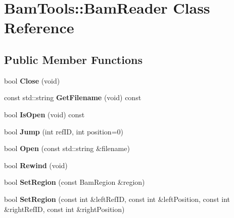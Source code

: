 \hypertarget{classBamTools_1_1BamReader}{\section{Bam\-Tools\-:\-:Bam\-Reader Class Reference}
\label{classBamTools_1_1BamReader}
}
\subsection*{Public Member Functions}
\begin{DoxyCompactItemize}
\item 
\hypertarget{classBamTools_1_1BamReader_a407a1b111a39799414861205888f5222}{bool {\bfseries Close} (void)}\label{classBamTools_1_1BamReader_a407a1b111a39799414861205888f5222}

\item 
\hypertarget{classBamTools_1_1BamReader_a89e0543264d18c3211af801c73a86f29}{const std\-::string {\bfseries Get\-Filename} (void) const }\label{classBamTools_1_1BamReader_a89e0543264d18c3211af801c73a86f29}

\item 
\hypertarget{classBamTools_1_1BamReader_ad7c2293df41620ccf29e755dc5e00baf}{bool {\bfseries Is\-Open} (void) const }\label{classBamTools_1_1BamReader_ad7c2293df41620ccf29e755dc5e00baf}

\item 
\hypertarget{classBamTools_1_1BamReader_a1fb656e73ef41db885dabeca2785168d}{bool {\bfseries Jump} (int ref\-I\-D, int position=0)}\label{classBamTools_1_1BamReader_a1fb656e73ef41db885dabeca2785168d}

\item 
\hypertarget{classBamTools_1_1BamReader_a1965ae6112e7dc0b604cb53ae8861a2c}{bool {\bfseries Open} (const std\-::string \&filename)}\label{classBamTools_1_1BamReader_a1965ae6112e7dc0b604cb53ae8861a2c}

\item 
\hypertarget{classBamTools_1_1BamReader_a2d92f430f12a0cf9e696c062a55e2c67}{bool {\bfseries Rewind} (void)}\label{classBamTools_1_1BamReader_a2d92f430f12a0cf9e696c062a55e2c67}

\item 
\hypertarget{classBamTools_1_1BamReader_ac23be0d0a814db6cff50d189506f9bab}{bool {\bfseries Set\-Region} (const Bam\-Region \&region)}\label{classBamTools_1_1BamReader_ac23be0d0a814db6cff50d189506f9bab}

\item 
\hypertarget{classBamTools_1_1BamReader_a62226301b1dae2f58e3fcec8bc0cdb7a}{bool {\bfseries Set\-Region} (const int \&left\-Ref\-I\-D, const int \&left\-Position, const int \&right\-Ref\-I\-D, const int \&right\-Position)}\label{classBamTools_1_1BamReader_a62226301b1dae2f58e3fcec8bc0cdb7a}


\end{DoxyCompactItemize}
